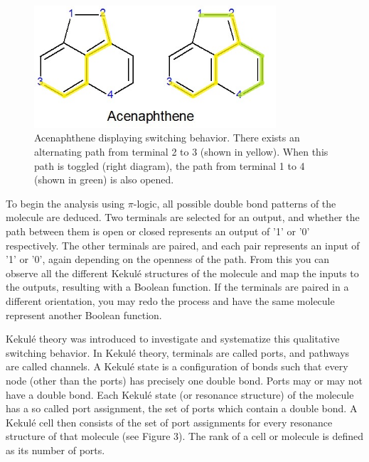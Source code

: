 \documentclass[12pt]{article}
\begin{document}
\begin{figure}[ht!]
\centering
\includegraphics[width=90mm]{AcenaphtheneHighlighted.jpg}
\caption{Acenaphthene displaying switching behavior. There exists an alternating path from terminal 2 to 3 (shown in yellow). When this path is toggled (right diagram), the path from terminal 1 to 4 (shown in green) is also opened.}
\end{figure}

To begin the analysis using $\pi$-logic, all possible double bond patterns of the molecule are deduced. Two terminals are selected for an output, and whether the path between them is open or closed represents an output of '1' or '0' respectively. The other terminals are paired, and each pair represents an input of '1' or '0', again depending on the openness of the path. From this you can observe all the different Kekul\'e structures of the molecule and map the inputs to the outputs, resulting with a Boolean function. If the terminals are paired in a different orientation, you may redo the process and have the same molecule represent another Boolean function. 

Kekul\'e theory was introduced \cite{HH13} to investigate and systematize this qualitative switching behavior. In Kekul\'e theory, terminals are called ports, and pathways are called channels. A Kekul\'e state is a configuration of bonds such that every node (other than the ports) has precisely one double bond. Ports may or may not have a double bond. Each Kekul\'e state (or resonance structure) of the molecule has a so called port assignment, the set of ports which contain a double bond. A Kekul\'e cell then consists of the set of port assignments for every resonance structure of that molecule (see Figure 3). The rank of a cell or molecule is defined as its number of ports.
\end{document}
